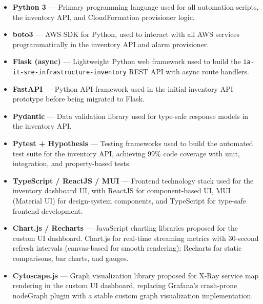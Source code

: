 \begin{itemize}

    \item \textbf{Python 3} --- Primary programming language used for
          all automation scripts, the inventory API, and CloudFormation
          provisioner logic.

    \item \textbf{boto3} --- AWS SDK for Python, used to interact with
          all AWS services programmatically in the inventory API and
          alarm provisioner.

    \item \textbf{Flask (async)} --- Lightweight Python web framework
          used to build the \texttt{ia-it-sre-infrastructure-inventory}
          REST API with async route handlers.

    \item \textbf{FastAPI} --- Python API framework used in the initial
          inventory API prototype before being migrated to Flask.

    \item \textbf{Pydantic} --- Data validation library used for
          type-safe response models in the inventory API.

    \item \textbf{Pytest + Hypothesis} --- Testing frameworks used to
          build the automated test suite for the inventory API, achieving
          99\% code coverage with unit, integration, and property-based tests.

    \item \textbf{TypeScript / ReactJS / MUI} --- Frontend technology
          stack used for the inventory dashboard UI, with
          ReactJS for component-based UI, MUI (Material UI) for
          design-system components, and TypeScript for type-safe
          frontend development.

    \item \textbf{Chart.js / Recharts} --- JavaScript charting libraries
          proposed for the custom UI dashboard.
          Chart.js for real-time streaming metrics with 30-second refresh
          intervals (canvas-based for smooth rendering); Recharts for
          static comparisons, bar charts, and gauges.

    \item \textbf{Cytoscape.js} --- Graph visualization library proposed
          for X-Ray service map rendering in the custom UI dashboard,
          replacing Grafana's crash-prone nodeGraph plugin with a stable 
          custom graph visualization implementation.


\end{itemize}
